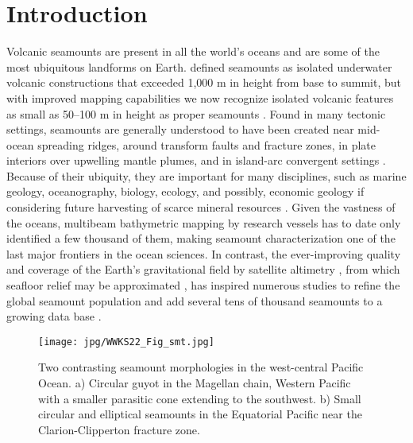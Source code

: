 %

\section{Introduction}
Volcanic seamounts are present in all the world's oceans and are some of the most ubiquitous
landforms on Earth. \citet{M1964} defined seamounts as isolated underwater volcanic constructions
that exceeded 1,000 m in height from base to summit, but with improved mapping capabilities we now
recognize isolated volcanic features as small as 50–100 m in height as proper seamounts \citep[e.g.,~][]{SC1990}.
Found in many tectonic settings, seamounts are generally understood to have been created near mid-ocean
spreading ridges, around transform faults and fracture zones, in plate interiors over upwelling
mantle plumes, and in island-arc convergent settings
\citep[e.g.,~][]{SC2010}. Because of their ubiquity, they are important for many disciplines, such as
marine geology, oceanography, biology, ecology, and possibly, economic geology if considering future harvesting of
scarce mineral resources \citep[e.g.,~][]{WSK2010,WK2010}. Given the vastness of the oceans, multibeam bathymetric
mapping by research vessels has to date only identified a few thousand of them, making seamount
characterization one of the last major frontiers in the ocean sciences. In contrast, the ever-improving
quality and coverage of the Earth's gravitational field by
satellite altimetry \citep[e.g.,~][]{Setal2021}, from which seafloor relief may be approximated
\citep[e.g.,~][]{SS1997}, has inspired numerous studies to refine the global seamount population and add several
tens of thousand seamounts to a growing data base \citep{CS1988,WL1997,W2001,KL2004,KW2011,G2022}. 
\begin{figure}
\centering
\noindent \texttt{[image: jpg/WWKS22\_Fig\_smt.jpg]}
\caption{Two contrasting seamount morphologies in the west-central Pacific Ocean. a) Circular guyot in the Magellan chain,
Western Pacific with a smaller parasitic cone extending to the southwest. b) Small circular and
elliptical seamounts in the Equatorial Pacific near the Clarion-Clipperton fracture zone.}
\label{WWKS22_Fig_sm}
\end{figure}

